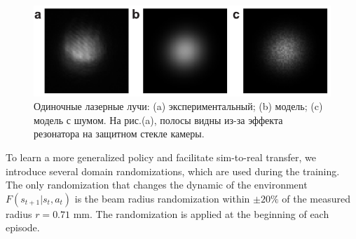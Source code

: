 




\begin{figure}
\centering
  \includegraphics[width=0.8\linewidth]{images/beamsamples.pdf}

\caption{Одиночные лазерные лучи: (a) экспериментальный; (b) модель; (c) модель с шумом. На рис.(a), полосы видны из-за эффекта резонатора на защитном стекле камеры.}
\label{fig:rad_fit}
\end{figure}

To learn a more generalized policy and facilitate sim-to-real transfer, we introduce several domain randomizations, which are used during the training. The only randomization that changes the dynamic of the environment $F(s_{t+1}|s_{t},a_{t})$ is the beam radius randomization within $\pm20\%$ of the measured radius $r=0.71$ mm. The randomization is applied at the beginning of each episode. 

